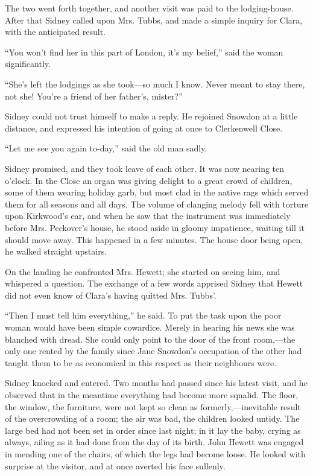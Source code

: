 The two went forth together, and another visit was paid to the
lodging-house. After that Sidney called upon Mrs. Tubbs, and made a
simple inquiry for Clara, with the anticipated result.

``You won't find her in this part of London, it's my belief,'' said the
woman significantly.

``She's left the lodgings as she took---so much I know. Never meant to
stay there, not she! You're a friend of her father's, mister?''

Sidney could not trust himself to make a reply. He rejoined Snowdon at a
little distance, and expressed his intention of going at once to
Clerkenwell Close.

``Let me see you again to-day,'' said the old man sadly.

Sidney promised, and they took leave of each other. It was now nearing
ten o'clock. In the Close an organ was giving delight to a great crowd
of children, some of them wearing holiday garb, but most clad in the
native rags which served them for all seasons and all days.
{\protect\hypertarget{282}{}{}}The volume of clanging melody fell with
torture upon Kirkwood's ear, and when he saw that the instrument was
immediately before Mrs. Peckover's house, he stood aside in gloomy
impatience, waiting till it should move away. This happened in a few
minutes. The house door being open, he walked straight upstairs.

On the landing he confronted Mrs. Hewett; she started on seeing him, and
whispered a question. The exchange of a few words apprised Sidney that
Hewett did not even know of Clara's having quitted Mrs. Tubbs'.

``Then I must tell him everything,'' he said. To put the task upon the
poor woman would have been simple cowardice. Merely in hearing his news
she was blanched with dread. She could only point to the door of the
front room,---the only one rented by the family since Jane Snowdon's
occupation of the other had taught them to be as economical in this
respect as their neighbours were.

Sidney knocked and entered. Two months had passed since his latest
visit, and he {\protect\hypertarget{283}{}{}}observed that in the
meantime everything had become more sqnalid. The floor, the window, the
furniture, were not kept so clean as formerly,---inevitable result of
the overcrowding of a room; the air was bad, the children looked untidy.
The large bed had not been set in order since last night; in it lay the
baby, crying as always, ailing as it had done from the day of its birth.
John Hewett was engaged in mending one of the chairs, of which the legs
had become loose. He looked with surprise at the visitor, and at once
averted his face sullenly.

